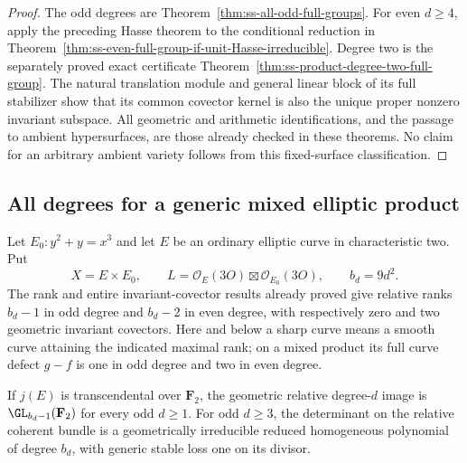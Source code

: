 \begin{proof}
The odd degrees are Theorem~\ref{thm:ss-all-odd-full-groups}.
For even $d\ge4$, apply the preceding Hasse theorem to the
conditional reduction in
Theorem~\ref{thm:ss-even-full-group-if-unit-Hasse-irreducible}.
Degree two is the separately proved exact certificate
Theorem~\ref{thm:ss-product-degree-two-full-group}.
The natural translation module and general linear block of its
full stabilizer show that its common covector kernel is also
the unique proper nonzero invariant subspace.
All geometric and arithmetic identifications, and the passage
to ambient hypersurfaces, are those already checked in these
theorems. No claim for an arbitrary ambient variety follows
from this fixed-surface classification.
\end{proof}


\subsection{All degrees for a generic mixed elliptic product}
\label{subsec:generic-mixed-product-groups-candidate}

Let $E_0:y^2+y=x^3$ and let $E$ be an ordinary elliptic curve
in characteristic two. Put
\[
 X=E\times E_0,\qquad
 L=\mathcal O_E(3O)\boxtimes\mathcal O_{E_0}(3O),\qquad
 b_d=9d^2.
\]
The rank and entire invariant-covector results already proved give
relative ranks $b_d-1$ in odd degree and $b_d-2$ in even degree,
with respectively zero and two geometric invariant covectors.
Here and below a sharp curve means a smooth curve attaining the
indicated maximal rank; on a mixed product its full curve defect
$g-f$ is one in odd degree and two in even degree.

\begin{lemma}
\label{lem:generic-mixed-odd-groups-candidate}
If $j(E)$ is transcendental over $\mathbf F_2$, the geometric
relative degree-$d$ image is $\GL_{b_d-1}(\mathbf F_2)$ for every
odd $d\ge1$. For odd $d\ge3$, the determinant on the relative
coherent bundle is a geometrically irreducible reduced homogeneous
polynomial of degree $b_d$, with generic stable loss one on its
divisor.
\end{lemma}

